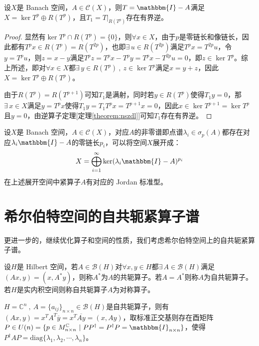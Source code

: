 \begin{lemma}
设$X$是 Banach 空间，$A \in \mathscr{C}(X)$，则$T=\mathbbm{I}-A$满足$X=\ker T^p \oplus R(T^p)$，且$T_1=T|_{R(T^p)}$存在有界逆。
\end{lemma}
\begin{proof}
显然有$\ker T^p \cap R(T^p)=\{0\}$，则$\forall x \in X$，由于$p$是零链长和像链长，因此都有$T^px \in R(T^p)=R(T^{2p})$，也即$\exists \, u \in R(T^{2p})$满足$T^px=T^{2p}u$，令$y=T^pu$，则$z=x-y$满足$T^pz=T^px-T^py=T^px-T^{2p}u=0$，即$z \in \ker T^p$。综上所述，即对$\forall x \in X$都$\exists \, y \in R(T^p) \ , \ z \in \ker T^p$满足$x=y+z$，因此$X=\ker T^p \oplus R(T^p)$。

由于$R(T^p)=R(T^{p+1})$可知$T_1$是满射，同时若$y \in R(T^p)$使得$T_1y=0$，那$\exists \, x \in X$满足$y=T^px$使得$T_1y=T_1T^px=T^{p+1}x=0$，因此$x \in \ker T^{p+1}=\ker T^p$且$y=0$，由逆算子定理[定理\ref{theorem:nszdl}]可知$T_1$存在有界逆。
\end{proof}

\begin{theorem}\label{theorem:jszfj}
设$X$是 Banach 空间，$A \in \mathscr{C}(X)$，对应$A$的非零谱即点谱$\lambda_i \in \sigma_p(A)$都存在对应$\lambda_i\mathbbm{I}-A$的零链长$p_i$，可以将空间$X$展开成：
\[X=\bigoplus_{i=1}^{\infty}\ker(\lambda_i\mathbbm{I}-A)^{p_i}\]
在上述展开空间中紧算子$A$有对应的 Jordan 标准型。
\end{theorem}

\section{希尔伯特空间的自共轭紧算子谱}\label{zgejszp}
更进一步的，继续优化算子和空间的性质，我们考虑希尔伯特空间上的自共轭紧算子谱。
\begin{definition}
设$H$是 Hilbert 空间，若$A\in\mathscr{B}(H)$对$\forall x,y \in H$都$\exists \, A\in\mathscr{B}(H)$满足$(Ax,y)=(x,A^*y)$，则称$A^*$为$A$的共轭算子。若$A=A^*$则称$A$为自共轭算子。若$H$是实内积空间则称自共轭算子$A$为对称算子。
\end{definition}

\begin{example}
\quad $H=\mathbb{C}^n \ , \ A=\{a_{ij}\}_{n \times n}\in\mathscr{B}(H)$是自共轭算子，则有$(Ax,y)=x^{T}A^{T}\overline{y}=x^{T}\overline{Ay}=(x,Ay)$，取标准正交基则存在酉矩阵$P \in U(n)=\{p \in M_{n \times n}^{\mathbb{C}} \ | \ PP^{\dagger}=P^{\dagger}P=\mathbbm{I}_{n \times n}\}$，使得$P^{\dagger}AP=\text{diag}\{\lambda_1,\lambda_2,\cdots,\lambda_n\}$。
\end{example}

